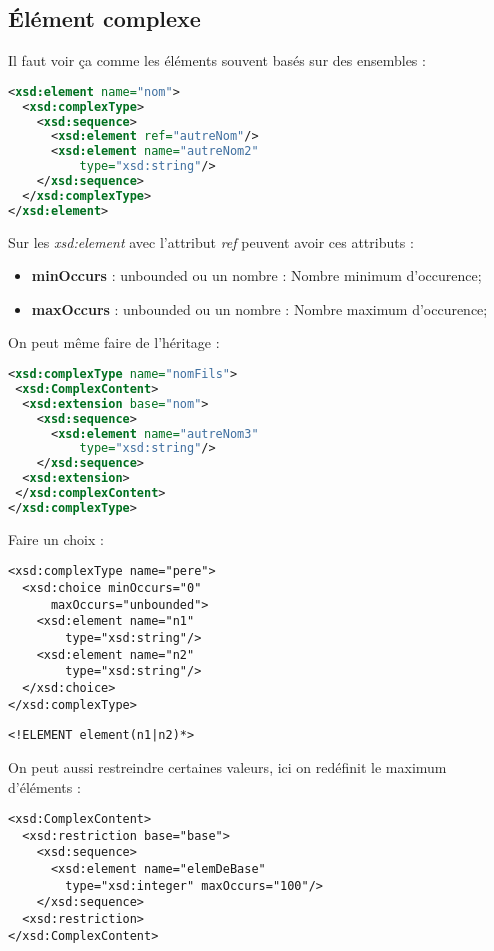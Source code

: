         \subsection{Élément complexe}
            Il faut voir ça comme les éléments souvent basés sur des ensembles :
            \begin{lstlisting}[language=XML]
<xsd:element name="nom">
  <xsd:complexType>
    <xsd:sequence>
      <xsd:element ref="autreNom"/>
      <xsd:element name="autreNom2"
          type="xsd:string"/>
    </xsd:sequence>
  </xsd:complexType>
</xsd:element>  
            \end{lstlisting}
            Sur les \textit{xsd:element} avec l'attribut \textit{ref} peuvent avoir ces attributs :
            \begin{itemize}
                \item \textbf{minOccurs} : unbounded ou un nombre : Nombre minimum d'occurence;
                \item \textbf{maxOccurs} : unbounded ou un nombre : Nombre maximum d'occurence;
            \end{itemize}
            On peut même faire de l'héritage :
            \begin{lstlisting}[language=XML]
<xsd:complexType name="nomFils">
 <xsd:ComplexContent>
  <xsd:extension base="nom">
    <xsd:sequence>
      <xsd:element name="autreNom3"
          type="xsd:string"/>
    </xsd:sequence>
  <xsd:extension>
 </xsd:complexContent>
</xsd:complexType>
            \end{lstlisting}
            Faire un choix :
            \begin{lstlisting}
<xsd:complexType name="pere">
  <xsd:choice minOccurs="0"
      maxOccurs="unbounded">
    <xsd:element name="n1"
        type="xsd:string"/>
    <xsd:element name="n2"
        type="xsd:string"/>
  </xsd:choice>
</xsd:complexType>
            \end{lstlisting}
            \begin{lstlisting}
<!ELEMENT element(n1|n2)*>
            \end{lstlisting}
            On peut aussi restreindre certaines valeurs, ici on redéfinit le maximum d'éléments :
            \begin{lstlisting}
<xsd:ComplexContent>
  <xsd:restriction base="base">
    <xsd:sequence>
      <xsd:element name="elemDeBase"
        type="xsd:integer" maxOccurs="100"/>
    </xsd:sequence>
  <xsd:restriction>
</xsd:ComplexContent>
            \end{lstlisting}
